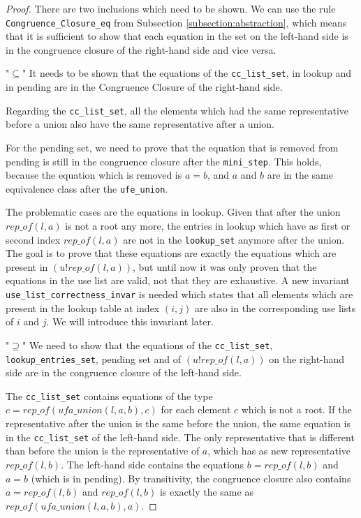 \begin{proof}
There are two inclusions which need to be shown. We can use the rule \lstinline{Congruence_Closure_eq} from Subsection \ref{subsection:abstraction}, which means that it is sufficient to show that each equation in the set on the left-hand side is in the congruence closure of the right-hand side and vice versa.

"$\subseteq$" It needs to be shown that the equations of the \lstinline{cc_list_set}, in lookup and in pending are in the Congruence Closure of the right-hand side.

Regarding the \lstinline{cc_list_set}, all the elements which had the same representative before a union also have the same representative after a union.

For the pending set, we need to prove that the equation that is removed from pending is still in the congruence closure after the \lstinline{mini_step}. This holds, because the equation which is removed is $a = b$, and $a$ and $b$ are in the same equivalence class after the \lstinline{ufe_union}.

The problematic cases are the equations in lookup. Given that after the union $rep\_of(l, a)$ is not a root any more, the entries in lookup which have as first or second index $rep\_of(l, a)$ are not in the \lstinline{lookup_set} anymore after the union. The goal is to prove that these equations are exactly the equations which are present in $(u ! rep\_of(l, a))$, but until now it was only proven that the equations in the use list are valid, not that they are exhaustive. A new invariant \lstinline{use_list_correctness_invar} is needed which states that all elements which are present in the lookup table at index $(i, j)$ are also in the corresponding use lists of $i$ and $j$. We will introduce this invariant later.

"$\supseteq$" We need to show that the equations of the \lstinline{cc_list_set}, \lstinline{lookup_entries_set}, pending set and of $(u ! rep\_of(l, a))$ on the right-hand side are in the congruence closure of the left-hand side.

The \lstinline{cc_list_set} contains equations of the type $c = rep\_of (ufa\_union(l, a, b), c)$ for each element $c$ which is not a root. If the representative after the union is the same before the union, the same equation is in the \lstinline{cc_list_set} of the left-hand side. The only representative that is different than before the union is the representative of $a$, which has as new representative $rep\_of(l, b)$. The left-hand side contains the equations $b = rep\_of(l, b)$ and $a = b$ (which is in pending). By transitivity, the congruence closure also contains $a = rep\_of(l, b)$ and $rep\_of(l, b)$ is exactly the same as $rep\_of (ufa\_union(l, a, b), a)$.


\end{proof}
